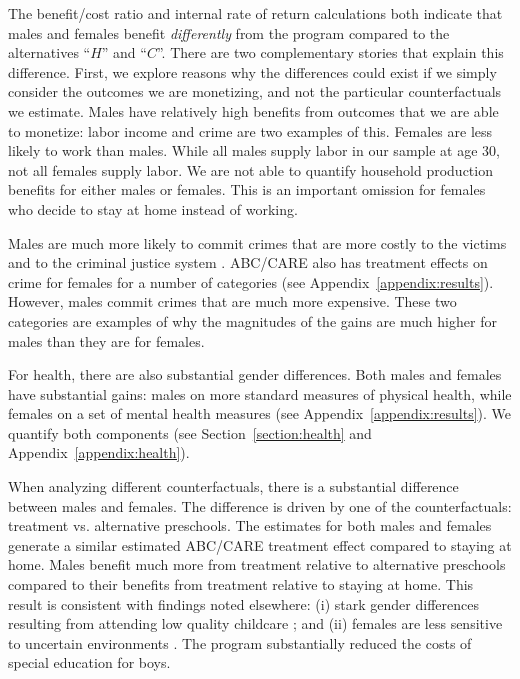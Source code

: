 The benefit/cost ratio and internal rate of return calculations both indicate that males and females benefit \emph{differently} from the program compared to the alternatives ``$H$'' and ``$C$''. There are two complementary stories that explain this difference. First, we explore reasons why the differences could exist if we simply consider the outcomes we are monetizing, and not the particular counterfactuals we estimate. Males have relatively high benefits from outcomes that we are able to monetize: labor income and crime are two examples of this. Females are less likely to work than males. While all males supply labor in our sample at age 30, not all females supply labor. We are not able to quantify household production benefits for either males or females. This is an important omission for females who decide to stay at home instead of working.

Males are much more likely to commit crimes that are more costly to the victims and to the criminal justice system \citep{Cohen-Bowles_2010_Estimating-Cost-Crime,Gregg_etal_2015_SocialRealities_BOOK}. ABC/CARE also has treatment effects on crime for females for a number of categories (see Appendix~\ref{appendix:results}). However, males commit crimes that are much more expensive. These two categories are examples of why the magnitudes of the gains are much higher for males than they are for females.

For health, there are also substantial gender differences. Both males and females have substantial gains: males on more standard measures of physical health, while females on a set of mental health measures (see Appendix~\ref{appendix:results}). We quantify both components (see Section~\ref{section:health} and Appendix~\ref{appendix:health}).

When analyzing different counterfactuals, there is a substantial difference between males and females. The difference is driven by one of the counterfactuals: treatment vs. alternative preschools. The estimates for both males and females generate a similar estimated ABC/CARE treatment effect compared to staying at home. Males benefit much more from treatment relative to alternative preschools compared to their benefits from treatment relative to staying at home. This result is consistent with findings noted elsewhere: (i) stark gender differences resulting from attending low quality childcare \citep{Kottelenberg-Lehrer_2014_Gender-Effects,Baker_Gruber_Milligan_2015_Noncog_Defects}; and (ii) females are less sensitive to uncertain environments \citep{Autor-etal_2015_Family-Disadvantage}. The program substantially reduced the costs of special education for boys.

